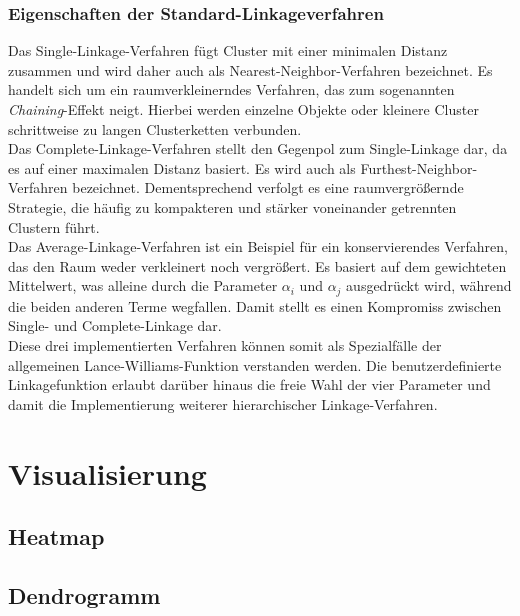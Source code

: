 \documentclass[12pt]{article}
\begin{document}
\subsubsection{Eigenschaften der Standard-Linkageverfahren}
\label{standard-linkage-eigenschaften}
Das Single-Linkage-Verfahren fügt Cluster mit einer minimalen Distanz zusammen und wird daher auch als Nearest-Neighbor-Verfahren bezeichnet. Es handelt sich um ein raumverkleinerndes Verfahren, das zum sogenannten \textit{Chaining}-Effekt neigt. Hierbei werden einzelne Objekte oder kleinere Cluster schrittweise zu langen Clusterketten verbunden.\\
Das Complete-Linkage-Verfahren stellt den Gegenpol zum Single-Linkage dar, da es auf einer maximalen Distanz basiert. Es wird auch als Furthest-Neighbor-Verfahren bezeichnet. Dementsprechend verfolgt es eine raumvergrößernde Strategie, die häufig zu kompakteren und stärker voneinander getrennten Clustern führt.\\
Das Average-Linkage-Verfahren ist ein Beispiel für ein konservierendes Verfahren, das den Raum weder verkleinert noch vergrößert. Es basiert auf dem gewichteten Mittelwert, was alleine durch die Parameter $\alpha_i$ und $\alpha_j$ ausgedrückt wird, während die beiden anderen Terme wegfallen. Damit stellt es einen Kompromiss zwischen Single- und Complete-Linkage dar.\\

Diese drei implementierten Verfahren können somit als Spezialfälle der allgemeinen Lance-Williams-Funktion verstanden werden. Die benutzerdefinierte Linkagefunktion erlaubt darüber hinaus die freie Wahl der vier Parameter und damit die Implementierung weiterer hierarchischer Linkage-Verfahren.




\newpage
\pagestyle{fancy}
\fancyhead{}
\section{Visualisierung}
\label{visualisierung}

\subsection{Heatmap}
\label{heatmap}

\subsection{Dendrogramm}
\label{dendrogramm}
\end{document}

